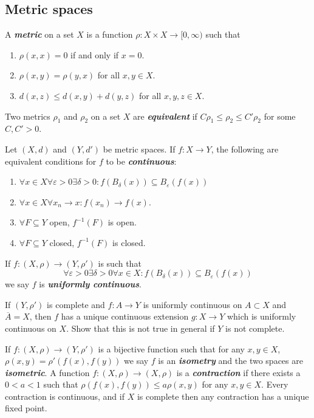 \documentclass{article}
\theoremstyle{definition}
\numberwithin{equation}{section}
\begin{document}
	\subsection{Metric spaces}
	 A \textbf{\textit{metric}} on a set $X$ is a function $\rho:X\times X\to [0,\infty)$ such that
	\begin{enumerate}
		\item $\rho(x,x)=0$ if and only if $x=0$.
		\item $\rho(x,y)=\rho(y,x)$ for all $x,y\in X$.
		\item $d(x,z)\leq d(x,y)+d(y,z)$ for all $x,y,z\in X$.
	\end{enumerate}
	Two metrics $\rho_1$ and $\rho_2$ on a set $X$ are \textbf{\textit{equivalent}} if $C\rho_1\leq\rho_2\leq C'\rho_2$ for some $C,C'>0$.
	
	\begin{thm}Let $(X,d)$ and $(Y,d')$ be metric spaces. If $f:X\to Y$, the following are equivalent conditions for $f$ to be \textbf{\textit{continuous}}:
		\begin{enumerate}
			\item $\forall x\in X\forall\varepsilon>0\exists\delta>0:f(B_\delta(x))\subseteq B_\varepsilon(f(x))$
			\item $\forall x\in X\forall x_n\to x:f(x_n)\to f(x)$.
			\item $\forall F\subseteq Y$ open, $f^{-1}(F)$ is open.
			\item $\forall F\subseteq Y$ closed, $f^{-1}(F)$ is closed.
		\end{enumerate}
	\end{thm}
	If $f:(X,\rho)\to(Y,\rho')$ is such that
	\[\forall\varepsilon>0\exists\delta>0\forall x\in X:f(B_\delta(x))\subseteq B_\varepsilon(f(x))\]
	we say $f$ is \textbf{\textit{uniformly continuous}}.
	\begin{exer*}
		If $(Y,\rho')$ is complete and $f:A\to Y$ is uniformly continuous on $A\subset X$ and $\overline{A}=X$, then $f$ has a unique continuous extension $g:X\to Y$ which is uniformly continuous on $X$. Show that this is not true in general if $Y$ is not complete.
	\end{exer*}
	If $f:(X,\rho)\to(Y,\rho')$ is a bijective function such that for any $x,y\in X$, $\rho(x,y)=\rho'(f(x),f(y))$ we say $f$ is an \textbf{\textit{isometry}} and the two spaces are \textbf{\textit{isometric}}. A function $f:(X,\rho)\to (X,\rho)$ is a \textbf{\textit{contraction}} if there exists a $0<a<1$ such that $\rho(f(x),f(y))\leq a\rho(x,y)$ for any $x,y\in X$. Every contraction is continuous, and if $X$ is complete then any contraction has a unique fixed point.
	
\end{document}
